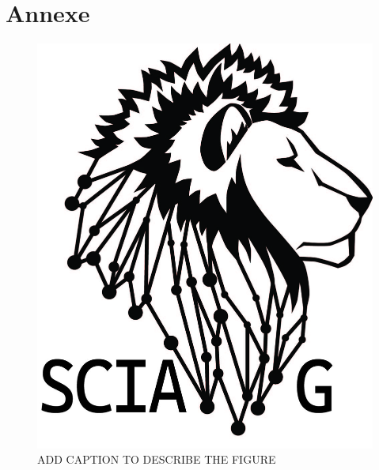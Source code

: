 \section{Annexe}

\begin{figure}[htb]
    \centering
    \includegraphics[scale=0.3]{logo/sciag.jpeg}
    \caption{ADD CAPTION TO DESCRIBE THE FIGURE}
    \label{fig:sciag_logo}
\end{figure}